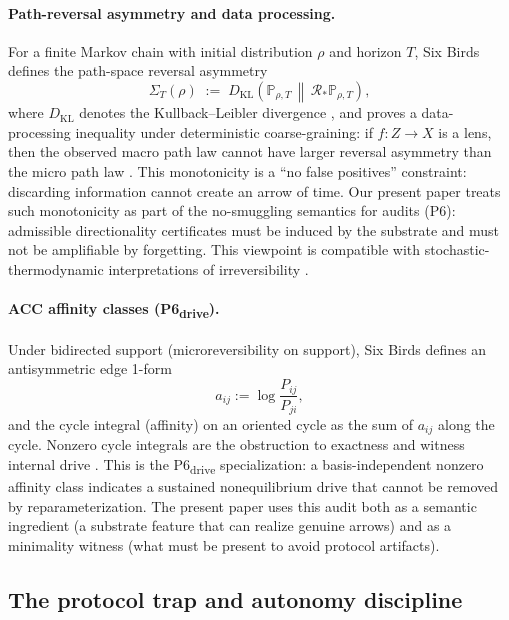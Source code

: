 \documentclass[11pt]{article}
\theoremstyle{definition}
\theoremstyle{remark}
\begin{document}
\paragraph{Path-reversal asymmetry and data processing.}
For a finite Markov chain with initial distribution $\rho$ and horizon $T$, Six Birds defines the path-space reversal asymmetry
\[
\Sigma_T(\rho) \;:=\; D_{\mathrm{KL}}\!\left(\mathbb P_{\rho,T}\,\middle\|\,\mathcal R_*\mathbb P_{\rho,T}\right),
\]
where $D_{\mathrm{KL}}$ denotes the Kullback--Leibler divergence \citep{kullback1951},
and proves a data-processing inequality under deterministic coarse-graining: if $f:Z\to X$ is a lens, then the observed macro path law cannot have larger reversal asymmetry than the micro path law \citep{cover2006}.
This monotonicity is a ``no false positives'' constraint: discarding information cannot create an arrow of time.
Our present paper treats such monotonicity as part of the no-smuggling semantics for audits (P6): admissible directionality certificates must be induced by the substrate and must not be amplifiable by forgetting.
This viewpoint is compatible with stochastic-thermodynamic interpretations of irreversibility \citep{seifert2012,lebowitzspohn1999}.

\paragraph{ACC affinity classes (P6\textsubscript{drive}).}
Under bidirected support (microreversibility on support), Six Birds defines an antisymmetric edge 1-form
\[
a_{ij} := \log\frac{P_{ij}}{P_{ji}},
\]
and the cycle integral (affinity) on an oriented cycle as the sum of $a_{ij}$ along the cycle.
Nonzero cycle integrals are the obstruction to exactness and witness internal drive \citep{schnakenberg1976,kelly1979}.
This is the P6\textsubscript{drive} specialization: a basis-independent nonzero affinity class indicates a sustained nonequilibrium drive that cannot be removed by reparameterization.
The present paper uses this audit both as a semantic ingredient (a substrate feature that can realize genuine arrows) and as a minimality witness (what must be present to avoid protocol artifacts).

\subsection{The protocol trap and autonomy discipline}
\end{document}
